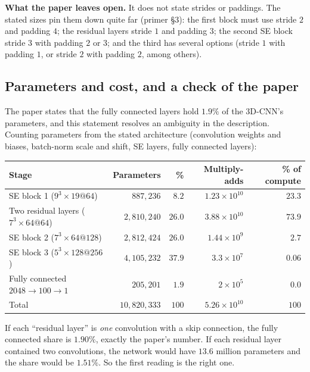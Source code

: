 \documentclass[11pt]{article}
\begin{document}
\textbf{What the paper leaves open.} It does not state strides or paddings. The stated sizes pin them down quite far (primer \S3): the first block must use stride $2$ and padding $4$; the residual layers stride $1$ and padding $3$; the second SE block stride $3$ with padding $2$ or $3$; and the third has several options (stride $1$ with padding $1$, or stride $2$ with padding $2$, among others).

\subsection*{Parameters and cost, and a check of the paper}
The paper states that the fully connected layers hold $1.9\%$ of the 3D-CNN's parameters, and this statement resolves an ambiguity in the description. Counting parameters from the stated architecture (convolution weights and biases, batch-norm scale and shift, SE layers, fully connected layers):

\begin{center}
\small
\begin{tabular}{@{}lrrrr@{}}
\toprule
Stage & Parameters & \% & Multiply-adds & \% of compute\\
\midrule
SE block 1 ($9^3\times19@64$) & $887{,}236$ & $8.2$ & $1.23\times10^{10}$ & $23.3$\\
Two residual layers ($7^3\times64@64$) & $2{,}810{,}240$ & $26.0$ & $3.88\times10^{10}$ & $73.9$\\
SE block 2 ($7^3\times64@128$) & $2{,}812{,}424$ & $26.0$ & $1.44\times10^{9}$ & $2.7$\\
SE block 3 ($5^3\times128@256$) & $4{,}105{,}232$ & $37.9$ & $3.3\times10^{7}$ & $0.06$\\
Fully connected $2048\to100\to1$ & $205{,}201$ & $1.9$ & $2\times10^{5}$ & $0.0$\\
\midrule
Total & $10{,}820{,}333$ & $100$ & $5.26\times10^{10}$ & $100$\\
\bottomrule
\end{tabular}
\end{center}

If each ``residual layer'' is \emph{one} convolution with a skip connection, the fully connected share is $\mathbf{1.90\%}$, exactly the paper's number. If each residual layer contained two convolutions, the network would have $13.6$ million parameters and the share would be $1.51\%$. So the first reading is the right one.
\end{document}
